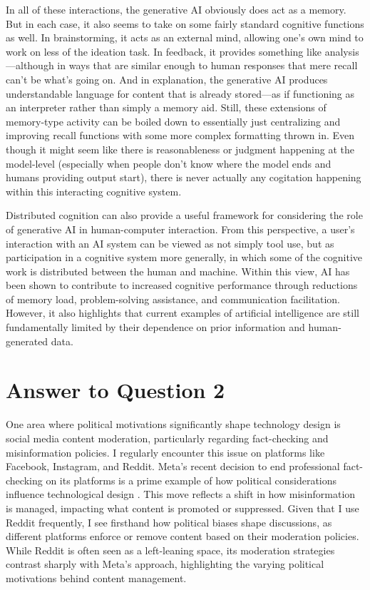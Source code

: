 \documentclass[
	letterpaper, %
]{jdf}
\begin{document}
In all of these interactions, the generative AI obviously does act as a memory. But in each case, it also seems to take on some fairly standard cognitive functions as well. In brainstorming, it acts as an external mind, allowing one’s own mind to work on less of the ideation task. In feedback, it provides something like analysis—although in ways that are similar enough to human responses that mere recall can’t be what’s going on. And in explanation, the generative AI produces understandable language for content that is already stored—as if functioning as an interpreter rather than simply a memory aid. Still, these extensions of memory-type activity can be boiled down to essentially just centralizing and improving recall functions with some more complex formatting thrown in. Even though it might seem like there is reasonableness or judgment happening at the model-level (especially when people don’t know where the model ends and humans providing output start), there is never actually any cogitation happening within this interacting cognitive system.

Distributed cognition can also provide a useful framework for considering the role of generative AI in human-computer interaction. From this perspective, a user’s interaction with an AI system can be viewed as not simply tool use, but as participation in a cognitive system more generally, in which some of the cognitive work is distributed between the human and machine. Within this view, AI has been shown to contribute to increased cognitive performance through reductions of memory load, problem-solving assistance, and communication facilitation. However, it also highlights that current examples of artificial intelligence are still fundamentally limited by their dependence on prior information and human-generated data.
\newpage

\section{Answer to Question 2}
One area where political motivations significantly shape technology design is social media content moderation, particularly regarding fact-checking and misinformation policies. I regularly encounter this issue on platforms like Facebook, Instagram, and Reddit. Meta’s recent decision to end professional fact-checking on its platforms is a prime example of how political considerations influence technological design . This move reflects a shift in how misinformation is managed, impacting what content is promoted or suppressed. Given that I use Reddit frequently, I see firsthand how political biases shape discussions, as different platforms enforce or remove content based on their moderation policies. While Reddit is often seen as a left-leaning space, its moderation strategies contrast sharply with Meta's approach, highlighting the varying political motivations behind content management.
\end{document}
